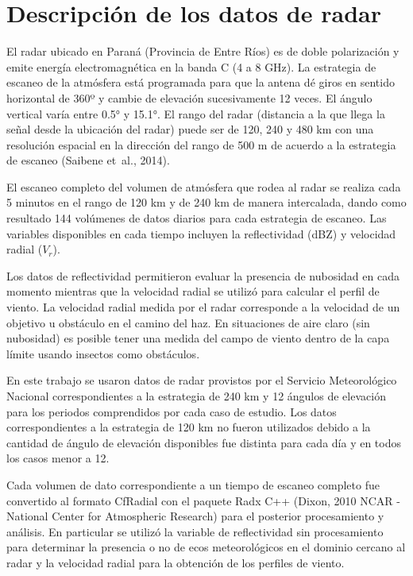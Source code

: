 \documentclass[12pt,spanish,oneside]{book}
\begin{document}
\section{Descripción de los datos de
radar}\label{descripcion-de-los-datos-de-radar}

El radar ubicado en Paraná (Provincia de Entre Ríos) es de doble
polarización y emite energía electromagnética en la banda C (4 a 8 GHz).
La estrategia de escaneo de la atmósfera está programada para que la
antena dé giros en sentido horizontal de 360º y cambie de elevación
sucesivamente 12 veces. El ángulo vertical varía entre 0.5° y 15.1°. El
rango del radar (distancia a la que llega la señal desde la ubicación
del radar) puede ser de 120, 240 y 480 km con una resolución espacial en
la dirección del rango de 500 m de acuerdo a la estrategia de escaneo
(Saibene et~al., 2014).

El escaneo completo del volumen de atmósfera que rodea al radar se
realiza cada 5 minutos en el rango de 120 km y de 240 km de manera
intercalada, dando como resultado 144 volúmenes de datos diarios para
cada estrategia de escaneo. Las variables disponibles en cada tiempo
incluyen la reflectividad (dBZ) y velocidad radial (\(V_r\)).

Los datos de reflectividad permitieron evaluar la presencia de nubosidad
en cada momento mientras que la velocidad radial se utilizó para
calcular el perfil de viento. La velocidad radial medida por el radar
corresponde a la velocidad de un objetivo u obstáculo en el camino del
haz. En situaciones de aire claro (sin nubosidad) es posible tener una
medida del campo de viento dentro de la capa límite usando insectos como
obstáculos.

En este trabajo se usaron datos de radar provistos por el Servicio
Meteorológico Nacional correspondientes a la estrategia de 240 km y 12
ángulos de elevación para los periodos comprendidos por cada caso de
estudio. Los datos correspondientes a la estrategia de 120 km no fueron
utilizados debido a la cantidad de ángulo de elevación disponibles fue
distinta para cada día y en todos los casos menor a 12.

Cada volumen de dato correspondiente a un tiempo de escaneo completo fue
convertido al formato CfRadial con el paquete Radx C++ (Dixon, 2010 NCAR
- National Center for Atmospheric Research) para el posterior
procesamiento y análisis. En particular se utilizó la variable de
reflectividad sin procesamiento para determinar la presencia o no de
ecos meteorológicos en el dominio cercano al radar y la velocidad radial
para la obtención de los perfiles de viento.
\end{document}
